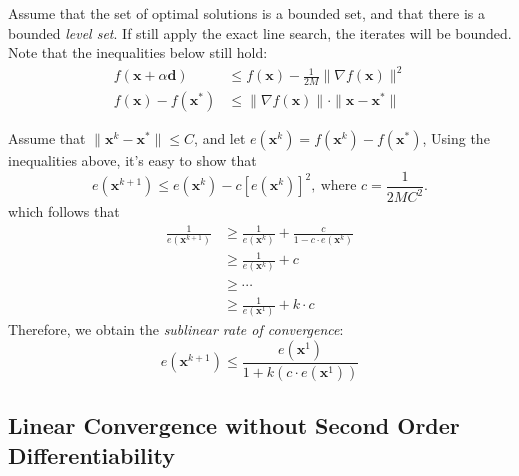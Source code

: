 Assume that the set of optimal solutions is a bounded set, and that there is a bounded \emph{level set}.
If still apply the exact line search, the iterates will be bounded. Note that the inequalities below still hold:
\begin{align*}
f(\bm x+\alpha\bm d)&\le f(\bm x) - \frac{1}{2M}\|\nabla f(\bm x)\|^2\\
f(\bm x) - f(\bm x^*)&\le \|\nabla f(\bm x)\|\cdot\|\bm x-\bm x^*\|
\end{align*}

Assume that $\|\bm x^k - \bm x^*\|\le C$, and let $e(\bm x^k) = f(\bm x^k) - f(\bm x^*)$, Using the inequalities above, it's easy to show that
\[
e(\bm x^{k+1})\le e(\bm x^k) - c [e(\bm x^k)]^2,\ \text{where }c = \frac{1}{2MC^2}.
\]
which follows that
\begin{align*}
\frac{1}{e(\bm x^{k+1})}&\ge\frac{1}{e(\bm x^k)}+\frac{c}{1-c\cdot e(\bm x^k)}\\
&\ge\frac{1}{e(\bm x^k)}+c\\&\ge\cdots\\
&\ge\frac{1}{e(\bm x^1)}+k\cdot c
\end{align*}
Therefore, we obtain the \emph{sublinear rate of convergence}:
\[
e(\bm x^{k+1}) \le \frac{e(\bm x^1)}{1+ k(c\cdot e(\bm x^1))}
\]

\subsection{Linear Convergence without Second Order Differentiability}

